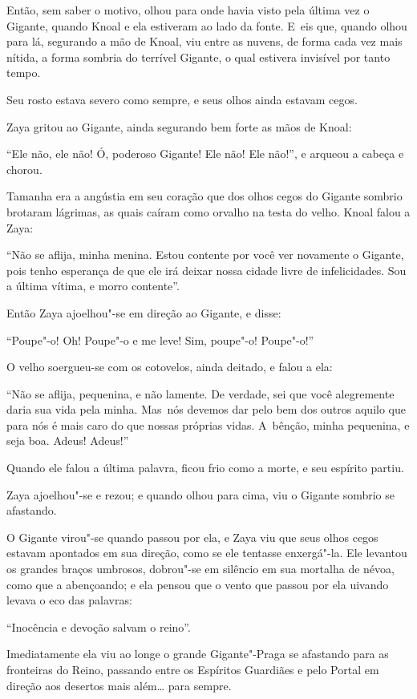 Então, sem saber o motivo, olhou para onde havia visto pela última vez o
Gigante, quando Knoal e ela estiveram ao lado da fonte. E~eis que, quando
olhou para lá, segurando a mão de Knoal, viu entre as nuvens, de
forma cada vez mais nítida, a forma sombria do terrível Gigante, o qual
estivera invisível por tanto tempo.

Seu rosto estava severo como sempre, e seus olhos ainda estavam cegos.

Zaya gritou ao Gigante, ainda segurando bem forte as mãos de Knoal:

``Ele não, ele não! Ó, poderoso Gigante! Ele não! Ele não!'', e arqueou
a cabeça e chorou.

Tamanha era a angústia em seu coração que dos olhos cegos do Gigante
sombrio brotaram lágrimas, as quais caíram como orvalho na testa do
velho. Knoal falou a Zaya:

``Não se aflija, minha menina. Estou contente por você ver novamente o
Gigante, pois tenho esperança de que ele irá deixar nossa cidade livre
de infelicidades. Sou a última vítima, e morro contente''.

Então Zaya ajoelhou"-se em direção ao Gigante, e disse:

``Poupe"-o! Oh! Poupe"-o e me leve! Sim, poupe"-o! Poupe"-o!''

O velho soergueu-se com os cotovelos, ainda deitado, e falou a ela:

``Não se aflija, pequenina, e não lamente. De verdade, sei que você
alegremente daria sua vida pela minha. Mas~nós devemos dar pelo bem dos
outros aquilo que para nós é mais caro do que nossas próprias vidas. A~bênção, minha pequenina, e seja boa. Adeus! Adeus!''

Quando ele falou a última palavra, ficou frio como a morte, e seu
espírito partiu.

Zaya ajoelhou"-se e rezou; e quando olhou para cima, viu o Gigante
sombrio se afastando.

O Gigante virou"-se quando passou por ela, e Zaya viu que seus olhos
cegos estavam apontados em sua direção, como se ele tentasse enxergá"-la.
Ele levantou os grandes braços umbrosos, dobrou"-se em silêncio em sua
mortalha de névoa, como que a abençoando; e ela pensou que o vento que
passou por ela uivando levava o eco das palavras:

``Inocência e devoção salvam o reino''.

\smallskip
Imediatamente ela viu ao longe o grande Gigante"-Praga se afastando para
as fronteiras do Reino, passando entre os Espíritos Guardiães e pelo
Portal em direção aos desertos mais além… para sempre.
